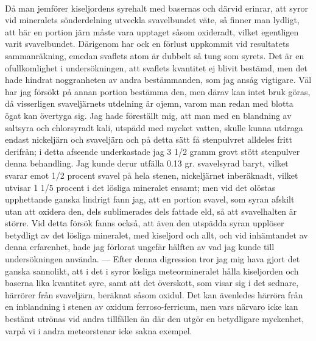 \documentclass[a4paper, 12pt, oneside, swedish]{article}
\begin{document}
\paragraph{}
Då man jemförer kiseljordens syrehalt med basernas och därvid erinrar, att syror vid mineralets sönderdelning utveckla svavelbundet väte, så finner man lydligt, att här en portion järn måste vara upptaget såsom oxideradt, vilket egentligen varit svavelbundet. Därigenom har ock en förlust uppkommit vid resultatets sammanräkning, emedan svaflets atom är dubbelt så tung som syrets. Det är en ofullkomlighet i undersökningen, att svaflets kvantitet ej blivit bestämd, men det hade hindrat noggranheten av andra bestämmanden, som jag ansåg vigtigare. Väl har jag försökt på annan portion bestämma den, men därav kan intet bruk göras, då visserligen svaveljärnets utdelning är ojemn, varom man redan med blotta ögat kan övertyga sig. Jag hade föreställt mig, att man med en blandning av saltsyra och chlorsyradt kali, utspädd med mycket vatten, skulle kunna utdraga endast nickeljärn och svaveljärn och på detta sätt få stenpulvret alldeles fritt derifrån; i detta afseende underkastade jag 3 1/2 gramm grovt stött stenpulver denna behandling. Jag kunde derur utfälla 0.13 gr. svavelsyrad baryt, vilket svarar emot 1/2 procent svavel på hela stenen, nickeljärnet inberäknadt, vilket utvisar 1 1/5 procent i det lösliga mineralet ensamt; men vid det olöstas upphettande ganska lindrigt fann jag, att en portion svavel, som syran afskilt utan att oxidera den, dels sublimerades dels fattade eld, så att svavelhalten är större. Vid detta försök fanns också, att även den utspädda syran upplöser betydligt av det lösliga mineralet, med kiseljord och allt, och vid inhämtandet av denna erfarenhet, hade jag förlorat ungefär hälften av vad jag kunde till undersökningen använda. --- Efter denna digression tror jag mig hava gjort det ganska sannolikt, att i det i syror lösliga meteormineralet hålla kiseljorden och baserna lika kvantitet syre, samt att det överskott, som visar sig i det sednare, härrörer från svaveljärn, beräknat såsom oxidul. Det kan ävenledes härröra från en inblandning i stenen av oxidum ferroso-ferricum, men vars närvaro icke kan bestämt utrönas vid andra tillfällen än där den utgör en betydligare myckenhet, varpå vi i andra meteorstenar icke sakna exempel.
\end{document}

